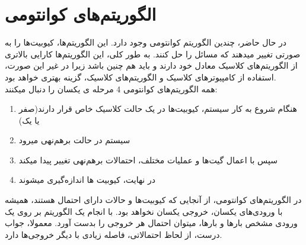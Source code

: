 \chapter{الگوریتم‌های کوانتومی‌}
در حال حاضر، چندین الگوریتم کوانتومی وجود دارد. این الگوریتم‌ها، کیوبیت‌ها را به صورتی تغییر میدهند که مسائل را حل کنند. به طور کلی، این الگوریتم‌ها کارایی بالاتری از الگوریتم‌های کلاسیک معادل خود دارند و باید هم چنین باشد زیرا در غیر این صورت، استفاده از کامپیوترهای کلاسیک و الگوریتم‌های کلاسیک، گزینه بهتری خواهد بود. 
\\
همه الگوریتم‌های کوانتومی 4 مرحله ی یکسان را دنبال میکنند:
\begin{enumerate}
\item
هنگام شروع به کار سیستم، کیوبیت‌ها در یک حالت کلاسیک خاص قرار دارند(صفر یا یک)
\item
سیستم در حالت برهم‌نهی میرود
\item
سپس با اعمال گیت‌ها و عملیات مختلف، احتمالات برهم‌نهی تغییر پیدا میکند
\item
در نهایت، کیوبیت ها اندازه‌گیری میشوند
\cite{cambridgebook}
\end{enumerate}
در الگوریتم‌های کوانتومی، از آنجایی که کیوبیت‌ها و حالات دارای احتمال هستند، همیشه با ورودی‌های یکسان، خروجی یکسان نخواهد بود. با انجام یک الگوریتم بر روی یک ورودی مشخص بارها و بارها، میتوان احتمال هر خروجی را بدست آورد. معمولا، جواب درست، از لحاظ احتمالاتی، فاصله زیادی با دیگر خروجی‌ها دارد.
